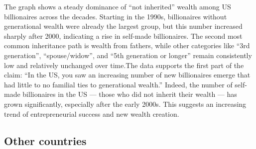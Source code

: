 \documentclass[11pt,preprint]{elsarticle}
\numberwithin{equation}{section}
\numberwithin{figure}{section}
\numberwithin{table}{section}
\begin{document}
The graph shows a steady dominance of ``not inherited'' wealth among US
billionaires across the decades. Starting in the 1990s, billionaires
without generational wealth were already the largest group, but this
number increased sharply after 2000, indicating a rise in self-made
billionaires. The second most common inheritance path is wealth from
fathers, while other categories like ``3rd generation'',
``spouse/widow'', and ``5th generation or longer'' remain consistently
low and relatively unchanged over time.The data supports the first part
of the claim: ``In the US, you saw an increasing number of new
billionaires emerge that had little to no familial ties to generational
wealth.'' Indeed, the number of self-made billionaires in the US ---
those who did not inherit their wealth --- has grown significantly,
especially after the early 2000s. This suggests an increasing trend of
entrepreneurial success and new wealth creation.

\subsection{Other countries}\label{other-countries}
\end{document}
